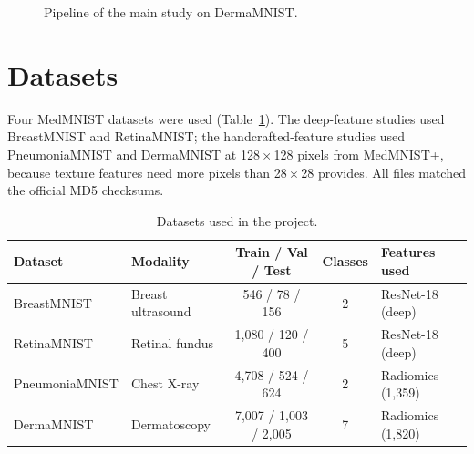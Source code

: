 \documentclass[12pt,a4paper]{report}
\begin{document}
\begin{figure}[H]
\centering
{}
\caption{Pipeline of the main study on DermaMNIST.}
\label{fig:pipeline}
\end{figure}

\section{Datasets}
Four MedMNIST datasets were used (Table~\ref{tab:datasets}). The deep-feature studies used BreastMNIST and
RetinaMNIST; the handcrafted-feature studies used PneumoniaMNIST and DermaMNIST at 128\,$\times$\,128 pixels from
MedMNIST+, because texture features need more pixels than 28\,$\times$\,28 provides. All files matched the official
MD5 checksums.

\begin{table}[H]
\centering
\caption{Datasets used in the project.}
\label{tab:datasets}
\small
\begin{tabular}{|l|l|c|c|l|}
\hline
\textbf{Dataset} & \textbf{Modality} & \textbf{Train / Val / Test} & \textbf{Classes} & \textbf{Features used} \\
\hline
BreastMNIST & Breast ultrasound & 546 / 78 / 156 & 2 & ResNet-18 (deep) \\
\hline
RetinaMNIST & Retinal fundus & 1,080 / 120 / 400 & 5 & ResNet-18 (deep) \\
\hline
PneumoniaMNIST & Chest X-ray & 4,708 / 524 / 624 & 2 & Radiomics (1,359) \\
\hline
DermaMNIST & Dermatoscopy & 7,007 / 1,003 / 2,005 & 7 & Radiomics (1,820) \\
\hline
\end{tabular}
\end{table}
\end{document}
